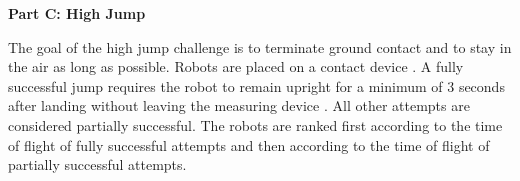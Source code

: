 \clearpage
\sffamily
{\bfseries \color[rgb]{0.4,0.4,0.4} Part C: High Jump}
{}


\bigskip

The goal of the high jump challenge is to terminate ground contact and to stay in the air as long as possible. Robots are placed on a contact device  . A fully successful jump requires the robot to remain upright for a minimum of 3 seconds after landing without leaving the measuring device . All other attempts are considered partially successful.  The robots are ranked first according to the time of flight of fully successful attempts and then according to the time of flight of partially successful attempts.
